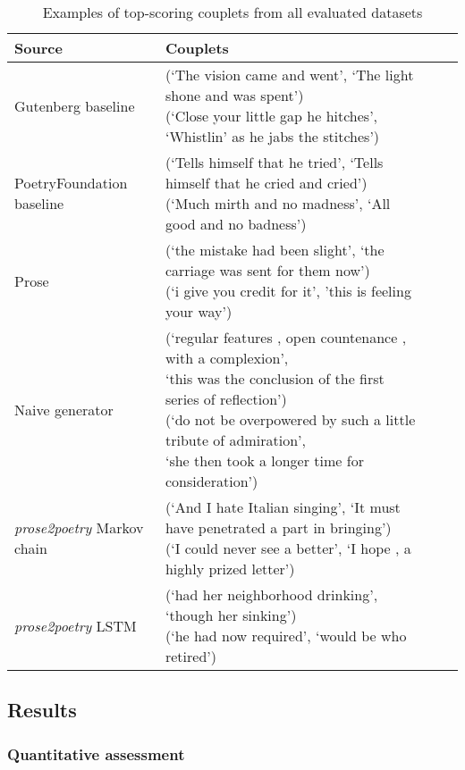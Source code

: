 \documentclass[11pt,a4paper]{article}
\begin{document}
\begin{table*}[ht]
\begin{tabular*}{\textwidth}{ll cc}
	\hline\hline
	Source & Couplets \\ [0.5ex]
	\hline\hline
	Gutenberg baseline & \makecell[l] {(`The vision came and went', `The light shone and was spent')\\(`Close your little gap he hitches', `Whistlin' as he jabs the stitches') } \\ [0.5ex]
	\hline
	PoetryFoundation baseline & \makecell[l]{(`Tells himself that he tried', `Tells himself that he cried and cried')\\(`Much mirth and no madness', `All good and no badness') } \\ [0.5ex]
	\hline
	Prose & \makecell[l]{(`the mistake had been slight', `the carriage was sent for them now')\\(`i give you credit for it', 'this is feeling your way')} \\ [0.5ex]
	\hline
	Naive generator & \makecell[l]{(`regular features , open countenance , with a complexion',\\`this was the conclusion of the first series of reflection')\\(`do not be overpowered by such a little tribute of admiration',\\`she then took a longer time for consideration')} \\ [0.5ex]
	\hline
	\textit{prose2poetry} Markov chain & \makecell[l]{(`And I hate Italian singing', `It must have penetrated a part in bringing')\\(`I could never see a better', `I hope , a highly prized letter')} \\ [-1.5ex]
	\hline
	\textit{prose2poetry} LSTM & \makecell[l]{(`had her neighborhood drinking', `though her sinking')\\(`he had now required', `would be who retired')} \\ [0.5ex]
	\hline
\end{tabular*}
\caption{Examples of top-scoring couplets from all evaluated datasets}
\label{table:bestcouplets}
\end{table*}

\subsection{Results}
\label{sec:results}
\subsubsection{Quantitative assessment}
\end{document}

